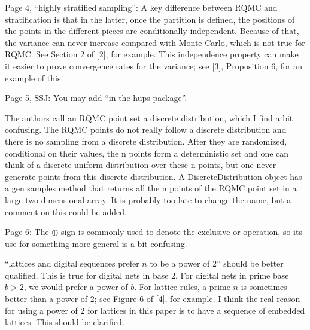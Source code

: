 \documentclass{amsart}
\begin{document}
Page 4, ``highly stratified sampling'': A key difference between RQMC and stratification is that in the latter, once the partition is defined, the positions of the points in the different pieces are conditionally independent. Because of that, the variance can never increase compared with Monte Carlo, which is not true for RQMC. See Section 2 of [2], for example. This independence property can make it easier to prove convergence rates for the variance; see
[3], Proposition 6, for an example of this. \vspace{1cm}

Page 5, SSJ: You may add “in the hups package”.

\vspace{1cm}

The authors call an RQMC point set a discrete distribution, which I find a bit confusing. The
RQMC points do not really follow a discrete distribution and there is no sampling from a discrete distribution. After they are randomized, conditional on their values, the n points form a deterministic set and one can think of a discrete uniform distribution over these n points, but one never generate points from this discrete distribution. A DiscreteDistribution object has a gen samples method that returns all the n points of the RQMC point set in a
large two-dimensional array. It is probably too late to change the name, but a comment on this could be added.


\vspace{1cm}

Page 6: The $\oplus$ sign is commonly used to denote the exclusive-or operation, so its use for
something more general is a bit confusing.


\vspace{1cm}

``lattices and digital sequences prefer $n$ to be a power of 2'' should be better qualified. This is true for digital nets in base 2. For digital nets in prime base $b > 2$, we would prefer a power of $b$. For lattice rules, a prime $n$ is sometimes better than a power of 2; see Figure 6 of [4], for example. I think the real reason for using a power of 2 for lattices in this paper is to have a sequence of embedded lattices. This should be clarified.

\end{document}

